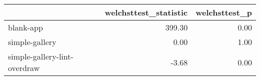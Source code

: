 \begin{tabular}{lrr}
\toprule
{} &  welchsttest\_statistic &  welchsttest\_p \\
\midrule
blank-app                    &                 399.30 &           0.00 \\
simple-gallery               &                   0.00 &           1.00 \\
simple-gallery-lint-overdraw &                  -3.68 &           0.00 \\
\bottomrule
\end{tabular}
